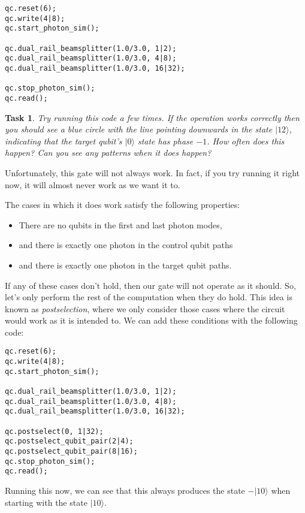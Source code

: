 \documentclass[twocolumn]{article}
\newtheorem{task}{Task}[section]
\begin{document}
\begin{lstlisting}
qc.reset(6);
qc.write(4|8);
qc.start_photon_sim();

qc.dual_rail_beamsplitter(1.0/3.0, 1|2);
qc.dual_rail_beamsplitter(1.0/3.0, 4|8);
qc.dual_rail_beamsplitter(1.0/3.0, 16|32);

qc.stop_photon_sim();
qc.read();
\end{lstlisting}

\begin{task}
Try running this code a few times. If the operation works correctly then you should see a blue circle with the line pointing downwards in the state $|12\rangle$, indicating that the target qubit's $|0\rangle$ state has phase $-1$. How often does this happen? Can you see any patterns when it does happen?
\end{task}

Unfortunately, this gate will not always work. In fact, if you try running it right now, it will almost never work as we want it to.

The cases in which it does work satisfy the following properties:

\begin{itemize}
\item There are no qubits in the first and last photon modes,
\item and there is exactly one photon in the control qubit paths
\item and there is exactly one photon in the target qubit paths.
\end{itemize}

If any of these cases don't hold, then our gate will not operate as it should. So, let's only perform the rest of the computation when they do hold. This idea is known as {\em postselection}, where we only consider those cases where the circuit would work as it is intended to. We can add these conditions with the following code:

\begin{lstlisting}
qc.reset(6);
qc.write(4|8);
qc.start_photon_sim();

qc.dual_rail_beamsplitter(1.0/3.0, 1|2);
qc.dual_rail_beamsplitter(1.0/3.0, 4|8);
qc.dual_rail_beamsplitter(1.0/3.0, 16|32);

qc.postselect(0, 1|32);
qc.postselect_qubit_pair(2|4);
qc.postselect_qubit_pair(8|16);
qc.stop_photon_sim();
qc.read();
\end{lstlisting}

Running this now, we can see that this always produces the state $-|10\rangle$ when starting with the state $|10\rangle$.
\end{document}
